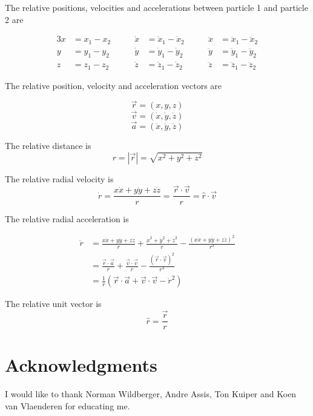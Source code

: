 \documentclass[12pt,a4paper]{article}
\theoremstyle{definition}
\theoremstyle{remark}
\begin{document}
The relative positions, velocities and accelerations between particle 1 and particle 2 are

\begin{alignat*}{3}
    x & = x_1 - x_2 \qquad & \dot{x} & = \dot{x}_1 - \dot{x}_2 \qquad & \ddot{x} & = \ddot{x}_1 - \ddot{x}_2 \\
    y & = y_1 - y_2 \qquad & \dot{y} & = \dot{y}_1 - \dot{y}_2 \qquad & \ddot{y} & = \ddot{y}_1 - \ddot{y}_2 \\
    z & = z_1 - z_2 \qquad & \dot{z} & = \dot{z}_1 - \dot{z}_2 \qquad & \ddot{z} & = \ddot{z}_1 - \ddot{z}_2
\end{alignat*}

The relative position, velocity and acceleration vectors are

$$\vec{r} = (x, y, z)$$
$$\vec{v} = (\dot{x}, \dot{y}, \dot{z})$$
$$\vec{a} = (\ddot{x}, \ddot{y}, \ddot{z})$$

The relative distance is
$$r = |\vec{r}| = \sqrt{x^2 + y^2 + z^2}$$

The relative radial velocity is
$$\dot{r} = \frac{x\dot{x} + y\dot{y} + z\dot{z}}{r} =  \frac{\vec{r} \cdot \vec{v}}{r} = \hat{r} \cdot \vec{v}$$

The relative radial acceleration is

\begin{align*}
    \ddot{r} & = \frac{x\ddot{x} + y\ddot{y} + z\ddot{z}}{r} + \frac{\dot{x}^2 + \dot{y}^2 + \dot{z}^2}{r} - \frac{(x\dot{x} + y\dot{y} + z\dot{z})^2}{r^3} \\
             & = \frac{\vec{r} \cdot \vec{a}}{r} + \frac{\vec{v} \cdot \vec{v}}{r} - \frac{(\vec{r} \cdot \vec{v})^2}{r^3}                                  \\
             & = \frac{1}{r}\left(\vec{r} \cdot \vec{a} + \vec{v} \cdot \vec{v} - \dot{r}^2\right)
\end{align*}

The relative unit vector is
$$\hat{r} = \frac{\vec{r}}{r}$$


\section*{Acknowledgments}
I would like to thank Norman Wildberger, Andre Assis, Ton Kuiper and Koen van Vlaenderen for educating me.


\end{document}
